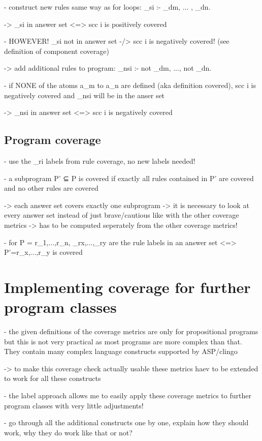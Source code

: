 - construct new rules same way as for loops: _si :- _dm, ... , _dn.

-> _si in answer set <=> scc i is positively covered

- HOWEVER! _si not in answer set -/> scc i is negatively covered! (see definition of component coverage)

-> add additional rules to program: _nsi :- not _dm, ..., not _dn.

- if NONE of the atoms a_m to a_n are defined (aka definition covered), scc i is negatively covered and _nsi will be in the anser set

-> _nsi in answer set <=> scc i is negatively covered

\subsection{Program coverage}
\label{subsec:Implementation/General approach/Program coverage}
- use the _ri labels from rule coverage, no new labels needed!

- a subprogram P' ⊆ P is covered if exactly all rules contained in P' are covered and no other rules are covered

-> each answer set covers exactly one subprogram -> it is necessary to look at every answer set instead of just brave/cautious like 
with the other coverage metrics -> has to be computed seperately from the other coverage metrics!

- for P = {r_1,...,r_n},  {_rx,...,_ry} are the rule labels in an answer set <=> P'={r_x,...,r_y} is covered

\section{Implementing coverage for further program classes}
\label{sec:Implementation/Implementing coverage for further program classes}
- the given definitions of the coverage metrics are only for propositional programs but this is not very practical as most programs 
are more complex than that. They contain many complex language constructs supported by ASP/clingo

-> to make this coverage check actually usable these metrics haev to be extended to work for all these constructs

- the label approach allows me to easily apply these coverage metrics to further program classes with very little adjustments!

- go through all the additional constructs one by one, explain how they should work, why they do work like that or not?

